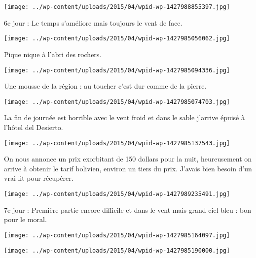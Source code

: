  \newline
\centerline{\texttt{[image: ../wp-content/uploads/2015/04/wpid-wp-1427988855397.jpg]} } 
 \newline
 6e jour : \newline
 Le temps s'améliore mais toujours le vent de face. \newline
 \newline
\centerline{\texttt{[image: ../wp-content/uploads/2015/04/wpid-wp-1427985056062.jpg]} } 
 \newline
 Pique nique à l'abri des rochers. \newline
 \newline
\centerline{\texttt{[image: ../wp-content/uploads/2015/04/wpid-wp-1427985094336.jpg]} } 
 \newline
 Une mousse de la région : au toucher c'est dur comme de la pierre. \newline
 \newline
\centerline{\texttt{[image: ../wp-content/uploads/2015/04/wpid-wp-1427985074703.jpg]} } 
 \newline
 La fin de journée est horrible avec le vent froid et dans le sable j'arrive épuisé à l'hôtel del Desierto. \newline
 \newline
\centerline{\texttt{[image: ../wp-content/uploads/2015/04/wpid-wp-1427985137543.jpg]} } 
 \newline
 On nous annonce un prix exorbitant de 150 dollars pour la nuit, heureusement on arrive à obtenir le tarif bolivien, environ un tiers du prix. J'avais bien besoin d'un vrai lit pour récupérer. \newline
 \newline
\centerline{\texttt{[image: ../wp-content/uploads/2015/04/wpid-wp-1427989235491.jpg]} } 
 \newline
 7e jour : \newline
 Première partie encore difficile et dans le vent mais grand ciel bleu : bon pour le moral. \newline
 \newline
\centerline{\texttt{[image: ../wp-content/uploads/2015/04/wpid-wp-1427985164097.jpg]} } 
 \newline
 \newline
\centerline{\texttt{[image: ../wp-content/uploads/2015/04/wpid-wp-1427985190000.jpg]} } 
 \newline
